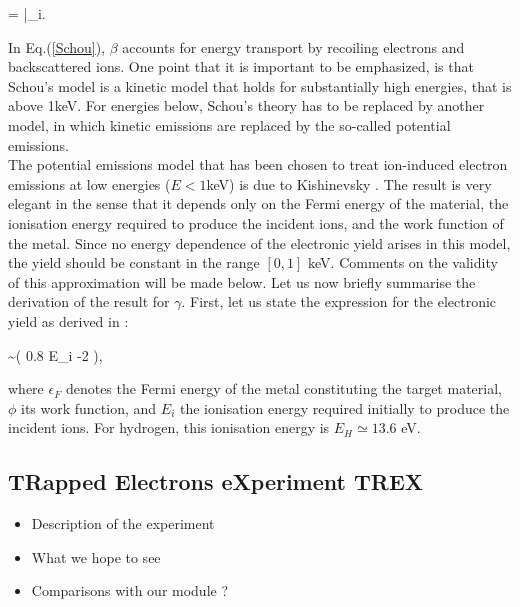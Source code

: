 \beq
\gamma = \Lambda \cdot \beta \cdot  {}\Bigg|_i.\label{Schou}
\eeq

\noindent In Eq.(\ref{Schou}), $\beta$ accounts for energy transport by recoiling electrons and backscattered ions. One point that it is important to be emphasized, is that Schou's model is a kinetic model that holds for substantially high energies, that is above 1keV. For energies below, Schou's theory has to be replaced by another model, in which kinetic emissions are replaced by the so-called potential emissions.\\

The potential emissions model that has been chosen to treat ion-induced electron emissions at low energies ($E<1$keV) is due to Kishinevsky \cite{Kishi73}. The result is very elegant in the sense that it depends only on the Fermi energy of the material, the ionisation energy required to produce the incident ions, and the work function of the metal. Since no energy dependence of the electronic yield arises in this model, the yield should be constant in the range $[0,1]$ keV. Comments on the validity of this approximation will be made below. Let us now briefly summarise the derivation of the result for $\gamma$. First, let us state the expression for the electronic yield as derived in \cite{Kishi73}: 

\beq
\gamma \sim {}\big( 0.8 \cdot E_i -2 \phi \big),\label{pot_em}
\eeq

\noindent where $\epsilon_F$ denotes the Fermi energy of the metal constituting the target material, $\phi$ its work function, and $E_i$ the ionisation energy required initially to produce the incident ions. For hydrogen, this ionisation energy is $E_H \simeq 13.6$ eV. 

\subsection{TRapped Electrons eXperiment TREX}
\begin{itemize}
\item{Description of the experiment}
\item{What we hope to see}
\item{Comparisons with our module ?}
\end{itemize}

